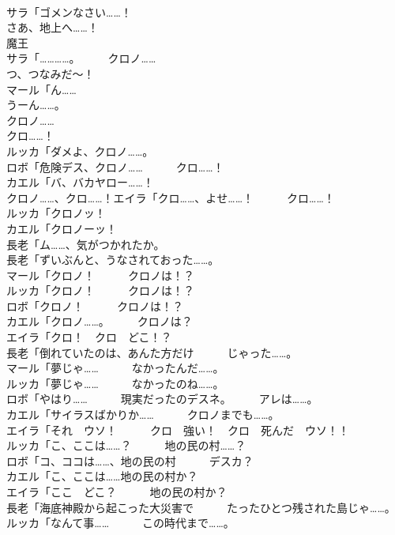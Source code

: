 \documentclass[8pt]{extreport}
\begin{document}
\begin{CJK}{UTF8}{min}
\\	サラ「ゴメンなさい……！	
\\	さあ、地上へ……！	
\\	魔王
\\	サラ「…………。　　　クロノ……	
\\	つ、つなみだ～！	
\\	マール「ん……	
\\	うーん……。	
\\	クロノ……	
\\	クロ……！	
\\	ルッカ「ダメよ、クロノ……。	
\\	ロボ「危険デス、クロノ……　　　クロ……！	
\\	カエル「バ、バカヤロー……！	
\\	クロノ……、クロ……！エイラ「クロ……、よせ……！　　　クロ……！	
\\	ルッカ「クロノッ！	
\\	カエル「クロノーッ！	
\\	長老「ム……、気がつかれたか。	
\\	長老「ずいぶんと、うなされておった……。	
\\	マール「クロノ！　　　クロノは！？	
\\	ルッカ「クロノ！　　　クロノは！？	
\\	ロボ「クロノ！　　　クロノは！？	
\\	カエル「クロノ……。　　　クロノは？	
\\	エイラ「クロ！　クロ　どこ！？	
\\	長老「倒れていたのは、あんた方だけ　　　じゃった……。	
\\	マール「夢じゃ……　　　なかったんだ……。	
\\	ルッカ「夢じゃ……　　　なかったのね……。	
\\	ロボ「やはり……　　　現実だったのデスネ。　　　アレは……。	
\\	カエル「サイラスばかりか……　　　クロノまでも……。	
\\	エイラ「それ　ウソ！　　　クロ　強い！　クロ　死んだ　ウソ！！	
\\	ルッカ「こ、ここは……？　　　地の民の村……？	
\\	ロボ「コ、ココは……、地の民の村　　　デスカ？	
\\	カエル「こ、ここは……地の民の村か？	
\\	エイラ「ここ　どこ？　　　地の民の村か？	
\\	長老「海底神殿から起こった大災害で　　　たったひとつ残された島じゃ……。	
\\	ルッカ「なんて事……　　　この時代まで……。	

\end{CJK}
\end{document}
